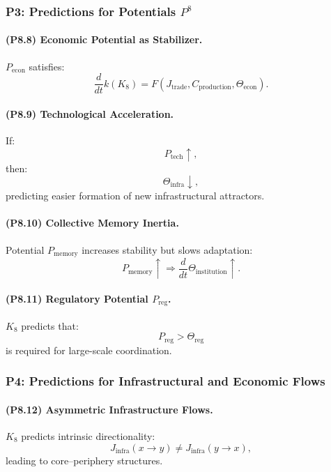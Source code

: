 \subsubsection{P3: Predictions for Potentials $P^{8}$}

\paragraph{(P8.8) Economic Potential as Stabilizer.}
$P_{\mathrm{econ}}$ satisfies:
\[
\frac{d}{dt} k(K_8) 
= F(J_{\mathrm{trade}}, C_{\mathrm{production}}, \Theta_{\mathrm{econ}}).
\]

\paragraph{(P8.9) Technological Acceleration.}
If:
\[
P_{\mathrm{tech}} \uparrow,
\]
then:
\[
\Theta_{\mathrm{infra}} \downarrow,
\]
predicting easier formation of new infrastructural attractors.

\paragraph{(P8.10) Collective Memory Inertia.}
Potential $P_{\mathrm{memory}}$ increases stability but slows adaptation:
\[
P_{\mathrm{memory}} \uparrow 
\Rightarrow 
\frac{d}{dt} \Theta_{\mathrm{institution}} \uparrow.
\]

\paragraph{(P8.11) Regulatory Potential $P_{\mathrm{reg}}$.}
$K_8$ predicts that:
\[
P_{\mathrm{reg}} > \Theta_{\mathrm{reg}}
\]
is required for large-scale coordination.

\subsubsection{P4: Predictions for Infrastructural and Economic Flows}

\paragraph{(P8.12) Asymmetric Infrastructure Flows.}
$K_8$ predicts intrinsic directionality:
\[
J_{\mathrm{infra}}(x \to y) 
\neq 
J_{\mathrm{infra}}(y \to x),
\]
leading to core–periphery structures.

